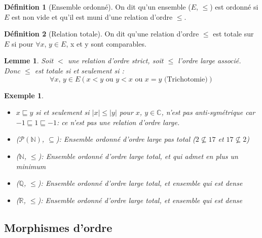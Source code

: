 \documentclass{article}
\theoremstyle{definition}
\newtheorem{definition}{Définition}
\theoremstyle{definition}
\theoremstyle{definition}
\theoremstyle{plain}
\newtheorem{example}{Exemple}
\theoremstyle{theorem}
\theoremstyle{theorem}
\newtheorem{lemma}{Lemme}
\begin{document}
\begin{definition}[Ensemble ordonné]

    On dit qu'un ensemble ($E$, $\leqslant$) est ordonné si $E$ est non vide et qu'il est muni d'une relation d'ordre $\leqslant$.

\end{definition}

\begin{definition}[Relation totale]

    On dit qu'une relation d'ordre $\leqslant$ est totale sur $E$ si pour $\forall x$, $y \in E$, x et y sont comparables.

\end{definition}

\begin{lemma}

    Soit $<$ une relation d'ordre strict, soit $\leqslant$ l'ordre large associé. Donc $\leqslant$ est totale si et seulement si :
	\begin{equation*}
        \forall x \text{, } y \in E (x < y \text{ ou } y < x \text{ ou } x = y \text{ (Trichotomie)})
	\end{equation*}
	\noindent

\end{lemma}

\begin{example}
    \begin{itemize}
        \item $x \sqsubseteq y$ si et seulement si $|x| \leqslant |y|$ pour $x$, $y \in \mathbb{C}$, n'est pas anti-symétrique
            car $-1 \sqsubseteq 1 \sqsubseteq -1$: ce n'est pas une relation d'ordre large.
        \item ($\mathscr{P}(\mathbb{N})$, $\subseteq$): Ensemble ordonné d'ordre large pas total (${2} \nsubseteq {17}$ et ${17} \nsubseteq {2}$)
        \item ($\mathbb{N}$, $\leqslant$): Ensemble ordonné d'ordre large total, et qui admet en plus un minimum
        \item ($\mathbb{Q}$, $\leqslant$): Ensemble ordonné d'ordre large total, et ensemble qui est dense
        \item ($\mathbb{R}$, $\leqslant$): Ensemble ordonné d'ordre large total, et ensemble qui est dense
    \end{itemize} 
\end{example}

\subsection{Morphismes d'ordre}
\end{document}
